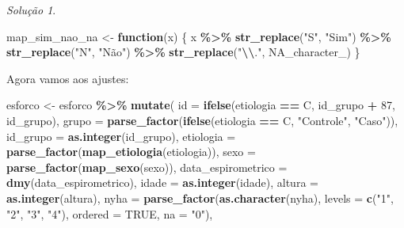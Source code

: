\documentclass[
]{latex/krantz}
\newenvironment{Shaded}{\begin{snugshade}}{\end{snugshade}}
\newcommand{\AttributeTok}[1]{\textcolor[rgb]{0.13,0.29,0.53}{#1}}
\newcommand{\ConstantTok}[1]{\textcolor[rgb]{0.56,0.35,0.01}{#1}}
\newcommand{\ControlFlowTok}[1]{\textcolor[rgb]{0.13,0.29,0.53}{\textbf{#1}}}
\newcommand{\DecValTok}[1]{\textcolor[rgb]{0.00,0.00,0.81}{#1}}
\newcommand{\FunctionTok}[1]{\textcolor[rgb]{0.13,0.29,0.53}{\textbf{#1}}}
\newcommand{\NormalTok}[1]{#1}
\newcommand{\OtherTok}[1]{\textcolor[rgb]{0.56,0.35,0.01}{#1}}
\newcommand{\SpecialCharTok}[1]{\textcolor[rgb]{0.81,0.36,0.00}{\textbf{#1}}}
\newcommand{\StringTok}[1]{\textcolor[rgb]{0.31,0.60,0.02}{#1}}
\theoremstyle{definition}
\theoremstyle{definition}
\theoremstyle{definition}
\theoremstyle{definition}
\theoremstyle{remark}
\newtheorem*{solution}{Solução}
\begin{document}
\begin{solution}
\begin{Shaded}
\begin{Highlighting}[]
\NormalTok{map\_sim\_nao\_na }\OtherTok{\textless{}{-}} \ControlFlowTok{function}\NormalTok{(x) \{}
\NormalTok{  x }\SpecialCharTok{\%\textgreater{}\%}
    \FunctionTok{str\_replace}\NormalTok{(}\StringTok{"S"}\NormalTok{, }\StringTok{"Sim"}\NormalTok{) }\SpecialCharTok{\%\textgreater{}\%}
    \FunctionTok{str\_replace}\NormalTok{(}\StringTok{"N"}\NormalTok{, }\StringTok{"Não"}\NormalTok{) }\SpecialCharTok{\%\textgreater{}\%}
    \FunctionTok{str\_replace}\NormalTok{(}\StringTok{"}\SpecialCharTok{\textbackslash{}\textbackslash{}}\StringTok{."}\NormalTok{, }\ConstantTok{NA\_character\_}\NormalTok{)}
\NormalTok{\}}
\end{Highlighting}
\end{Shaded}

Agora vamos aos ajustes:

\begin{Shaded}
\begin{Highlighting}[]
\NormalTok{esforco }\OtherTok{\textless{}{-}}\NormalTok{ esforco }\SpecialCharTok{\%\textgreater{}\%}
              \FunctionTok{mutate}\NormalTok{(}
                \AttributeTok{id =} \FunctionTok{ifelse}\NormalTok{(etiologia }\SpecialCharTok{==} \StringTok{\textquotesingle{}C\textquotesingle{}}\NormalTok{, id\_grupo }\SpecialCharTok{+} \DecValTok{87}\NormalTok{, id\_grupo),}
                \AttributeTok{grupo =} \FunctionTok{parse\_factor}\NormalTok{(}\FunctionTok{ifelse}\NormalTok{(etiologia }\SpecialCharTok{==} \StringTok{\textquotesingle{}C\textquotesingle{}}\NormalTok{, }\StringTok{"Controle"}\NormalTok{, }\StringTok{"Caso"}\NormalTok{)),}
                \AttributeTok{id\_grupo =} \FunctionTok{as.integer}\NormalTok{(id\_grupo),}
                \AttributeTok{etiologia =} \FunctionTok{parse\_factor}\NormalTok{(}\FunctionTok{map\_etiologia}\NormalTok{(etiologia)),}
                \AttributeTok{sexo =} \FunctionTok{parse\_factor}\NormalTok{(}\FunctionTok{map\_sexo}\NormalTok{(sexo)),}
                \AttributeTok{data\_espirometrico =} \FunctionTok{dmy}\NormalTok{(data\_espirometrico),}
                \AttributeTok{idade =} \FunctionTok{as.integer}\NormalTok{(idade),}
                \AttributeTok{altura =} \FunctionTok{as.integer}\NormalTok{(altura),}
                \AttributeTok{nyha =} \FunctionTok{parse\_factor}\NormalTok{(}\FunctionTok{as.character}\NormalTok{(nyha), }\AttributeTok{levels =} \FunctionTok{c}\NormalTok{(}\StringTok{"1"}\NormalTok{, }\StringTok{"2"}\NormalTok{, }\StringTok{"3"}\NormalTok{, }\StringTok{"4"}\NormalTok{), }\AttributeTok{ordered =} \ConstantTok{TRUE}\NormalTok{, }\AttributeTok{na =} \StringTok{"0"}\NormalTok{),}

\end{Highlighting}
\end{Shaded}
\end{solution}
\end{document}
